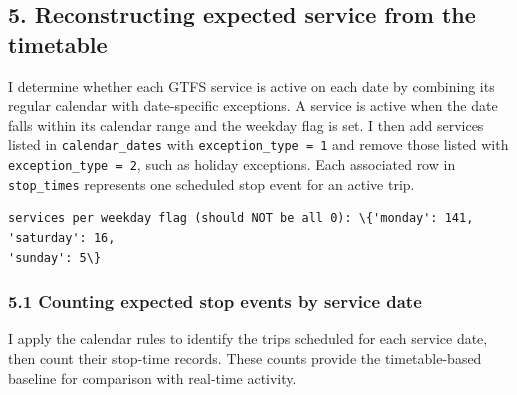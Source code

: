 \documentclass[11pt]{article}
\begin{document}
    \subsection{5. Reconstructing expected service from the
timetable}\label{reconstructing-expected-service-from-the-timetable}

I determine whether each GTFS service is active on each date by
combining its regular calendar with date-specific exceptions. A service
is active when the date falls within its calendar range and the weekday
flag is set. I then add services listed in \texttt{calendar\_dates} with
\texttt{exception\_type\ =\ 1} and remove those listed with
\texttt{exception\_type\ =\ 2}, such as holiday exceptions. Each
associated row in \texttt{stop\_times} represents one scheduled stop
event for an active trip.

    \begin{Verbatim}[commandchars=\\\{\}]
services per weekday flag (should NOT be all 0): \{'monday': 141, 'saturday': 16,
'sunday': 5\}
    \end{Verbatim}

    \subsubsection{5.1 Counting expected stop events by service
date}\label{counting-expected-stop-events-by-service-date}

I apply the calendar rules to identify the trips scheduled for each
service date, then count their stop-time records. These counts provide
the timetable-based baseline for comparison with real-time activity.
\end{document}
